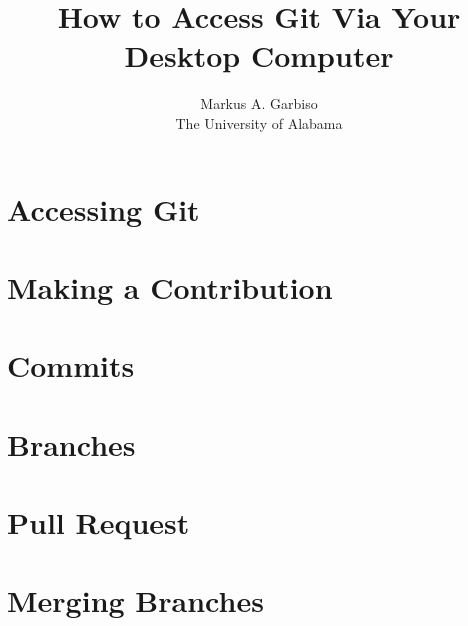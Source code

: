 \documentclass{article}
\title{How to Access Git Via Your Desktop Computer} %
\author{Markus A. Garbiso \\ The University of Alabama} %
\begin{document}
\maketitle

\section{Accessing Git}

\section{Making a Contribution}

\section{Commits}

\section{Branches}

\section{Pull Request}

\section{Merging Branches}
\end{document}
